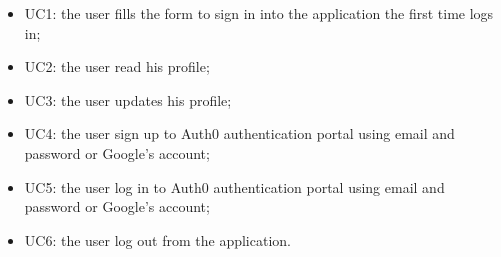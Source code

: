 \begin{itemize}
	\item UC1: the user fills the form to sign in into the application the first time logs in;
	\item UC2: the user read his profile;
	\item UC3: the user updates his profile;
	\item UC4: the user sign up to Auth0 authentication portal using email and password or Google's account;
	\item UC5: the user log in to Auth0 authentication portal using email and password or Google's account;
	\item UC6: the user log out from the application.
\end{itemize}

